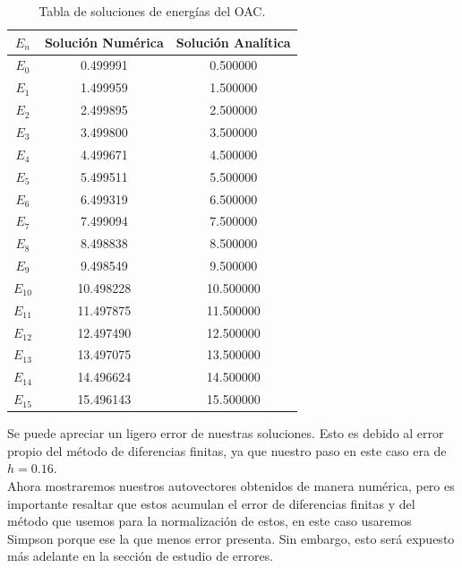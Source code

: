 \documentclass[12pt]{article}
\begin{document}
        \begin{table}[H]
            \centering
            \begin{tabular}{|c||c||c|}
            \hline
             $E_n$& Solución Numérica &Solución Analítica \\ [0.5ex] 
            \hline\hline
            $E_0$& 0.499991 & 0.500000 \\
            \hline
            $E_1$& 1.499959 & 1.500000 \\
            \hline
            $E_2$& 2.499895 &  2.500000\\
            \hline
            $E_3$& 3.499800  & 3.500000 \\
            \hline
            $E_4$& 4.499671 & 4.500000\\
            \hline
            $E_5$& 5.499511 & 5.500000 \\
            \hline
            $E_6$& 6.499319 & 6.500000 \\
            \hline
            $E_7$& 7.499094  & 7.500000 \\
            \hline
            $E_8$& 8.498838 & 8.500000 \\
            \hline
            $E_9$& 9.498549 & 9.500000 \\
            \hline
            $E_10$& 10.498228 & 10.500000 \\
            \hline
             $E_11$& 11.497875& 11.500000 \\
            \hline
            $E_12$& 12.497490 & 12.500000 \\
            \hline
            $E_13$& 13.497075 & 13.500000 \\
            \hline
            $E_14$& 14.496624 & 14.500000 \\
            \hline
            $E_15$& 15.496143 & 15.500000 \\
            \hline
            \end{tabular}
            \caption{Tabla de soluciones de energías del OAC.}
            \end{table}
            
    Se puede apreciar un ligero error de nuestras soluciones. Esto es debido al error propio del método de diferencias finitas, ya que nuestro paso en este caso era de $h=0.16$.\\
    
    Ahora mostraremos nuestros autovectores obtenidos de manera numérica, pero es importante resaltar que estos acumulan el error de diferencias finitas y del método que usemos para la normalización de estos, en este caso usaremos Simpson porque ese la que menos error presenta. Sin embargo, esto será expuesto más adelante en la sección de estudio de errores.
    
\end{document}
